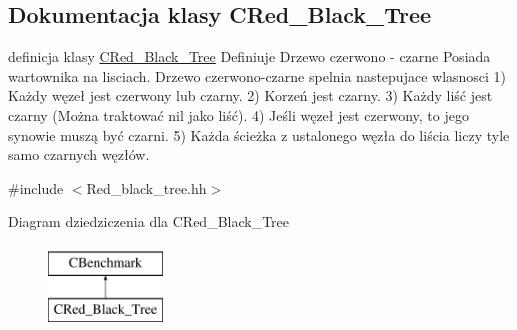 \hypertarget{class_c_red___black___tree}{}\subsection{Dokumentacja klasy C\+Red\+\_\+\+Black\+\_\+\+Tree}
\label{class_c_red___black___tree}


definicja klasy \hyperlink{class_c_red___black___tree}{C\+Red\+\_\+\+Black\+\_\+\+Tree} Definiuje Drzewo czerwono -\/ czarne Posiada wartownika na lisciach. Drzewo czerwono-\/czarne spelnia nastepujace wlasnosci 1) Każdy węzeł jest czerwony lub czarny. 2) Korzeń jest czarny. 3) Każdy liść jest czarny (Można traktować nil jako liść). 4) Jeśli węzeł jest czerwony, to jego synowie muszą być czarni. 5) Każda ścieżka z ustalonego węzła do liścia liczy tyle samo czarnych węzłów.  




{\ttfamily \#include $<$Red\+\_\+black\+\_\+tree.\+hh$>$}

Diagram dziedziczenia dla C\+Red\+\_\+\+Black\+\_\+\+Tree\begin{figure}[H]
\begin{center}
\leavevmode
\includegraphics[height=2.000000cm]{class_c_red___black___tree}
\end{center}
\end{figure}
